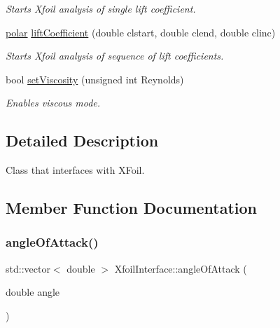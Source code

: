 \begin{DoxyCompactItemize}
\begin{DoxyCompactList}\small\item\em Starts Xfoil analysis of single lift coefficient. \end{DoxyCompactList}\item 
\hyperlink{classpolar}{polar} \hyperlink{classXfoilInterface_a04e40003487d76af5f29be2a26103fd3}{lift\+Coefficient} (double clstart, double clend, double clinc)
\begin{DoxyCompactList}\small\item\em Starts Xfoil analysis of sequence of lift coefficients. \end{DoxyCompactList}\item 
\mbox{\label{classXfoilInterface_a80e8724704363aa11365f79b338bf20c}} 
bool \hyperlink{classXfoilInterface_a80e8724704363aa11365f79b338bf20c}{set\+Viscosity} (unsigned int Reynolds)
\begin{DoxyCompactList}\small\item\em Enables viscous mode. \end{DoxyCompactList}\end{DoxyCompactItemize}


\subsection{Detailed Description}
Class that interfaces with X\+Foil. 

\subsection{Member Function Documentation}
\mbox{\label{classXfoilInterface_a7937559afde3fe6880b64b4d8b278256}} 
\subsubsection{\texorpdfstring{angle\+Of\+Attack()}{angleOfAttack()}\hspace{0.1cm}{\footnotesize\ttfamily [1/2]}}
{\footnotesize\ttfamily std\+::vector$<$ double $>$ Xfoil\+Interface\+::angle\+Of\+Attack (\begin{DoxyParamCaption}\item[{double}]{angle }\end{DoxyParamCaption})}



